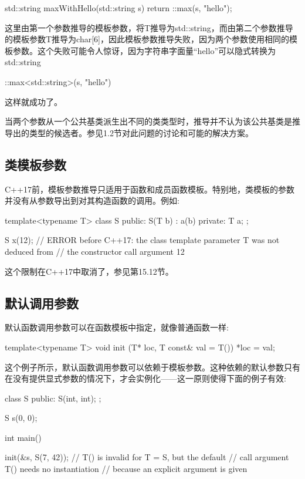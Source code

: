 \begin{cpp}
std::string maxWithHello(std::string s)
{
	return ::max(s, "hello");
}
\end{cpp}

这里由第一个参数推导的模板参数，将T推导为std::string，而由第二个参数推导的模板参数T推导为char[6]，因此模板参数推导失败，因为两个参数使用相同的模板参数。这个失败可能令人惊讶，因为字符串字面量“hello”可以隐式转换为std::string

\begin{cpp}
::max<std::string>(s, "hello")
\end{cpp}

这样就成功了。

当两个参数从一个公共基类派生出不同的类类型时，推导并不认为该公共基类是推导出的类型的候选者。参见1.2节对此问题的讨论和可能的解决方案。

\subsection{类模板参数}

C++17前，模板参数推导只适用于函数和成员函数模板。特别地，类模板的参数并没有从参数导出到对其构造函数的调用。例如:

\begin{cpp}
template<typename T>
class S {
	public:
	S(T b) : a(b) {
	}
	private:
	T a;
};

S x(12); // ERROR before C++17: the class template parameter T was not deduced from
// the constructor call argument 12
\end{cpp}

这个限制在C++17中取消了，参见第15.12节。

\subsection{默认调用参数}

默认函数调用参数可以在函数模板中指定，就像普通函数一样:

\begin{cpp}
template<typename T>
void init (T* loc, T const& val = T())
{
	*loc = val;
}
\end{cpp}

这个例子所示，默认函数调用参数可以依赖于模板参数。这种依赖的默认参数只有在没有提供显式参数的情况下，才会实例化——这一原则使得下面的例子有效:

\begin{cpp}
class S {
	public:
	S(int, int);
};

S s(0, 0);

int main()

{
	init(&s, S(7, 42)); // T() is invalid for T = S, but the default
	// call argument T() needs no instantiation
	// because an explicit argument is given
}
\end{cpp}

